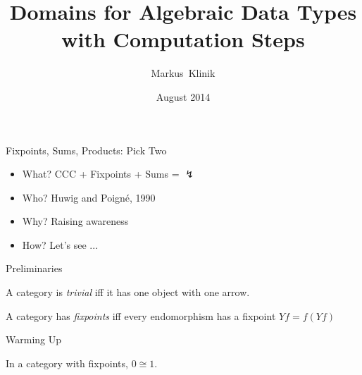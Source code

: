 \documentclass{beamer}
\title
{Domains for Algebraic Data Types with Computation Steps}
\author
{Markus~Klinik}
\institute[Radboud University Nijmegen]
{
  Radboud University Nijmegen
}
\date
{August 2014}
\begin{document}
\begin{frame}
  \titlepage
\end{frame}

\begin{frame}{Fixpoints, Sums, Products: Pick Two}

\begin{itemize}
\item What? CCC + Fixpoints + Sums = $\lightning$
\item Who? Huwig and Poign\'e, 1990
\item Why? Raising awareness
\item How? Let's see ...
\end{itemize}

\end{frame}


\begin{frame}[fragile]{Preliminaries}

\begin{definition}
A category is \emph{trivial} iff it has one object with one arrow.
\end{definition}

\begin{definition}
A category has \emph{fixpoints} iff every endomorphism has a fixpoint $Yf =
f(Yf)$
\end{definition}

\begin{center}
\end{center}

\end{frame}



\begin{frame}[fragile]{Warming Up}

\begin{lemma}
In a category with fixpoints, $0 \cong 1$.
\end{lemma}

\vfill

\begin{center}
\end{center}

\end{frame}
\end{document}
